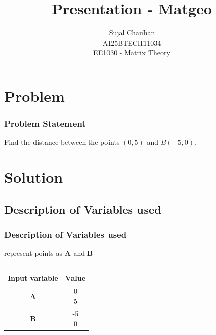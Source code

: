 \documentclass{beamer}
\title{Presentation - Matgeo}
\author{ Sujal Chauhan\\
AI25BTECH11034 \\
EE1030 - Matrix Theory}
\theoremstyle{remark}
\newcommand{\myvec}[1]{\ensuremath{\begin{pmatrix}#1\end{pmatrix}}}
\let\vec\mathbf
\numberwithin{equation}{section}
\begin{document}
\begin{frame}
\titlepage
\end{frame}

\section{Problem}
\begin{frame}
\frametitle{Problem Statement}
Find the distance between the points $(0,5)$ and $B(-5,0)$.
\end{frame}

\section{Solution}
\subsection{Description of Variables used}

\begin{frame}
\frametitle{Description of Variables used}
represent points as $\vec{A} $ and $\vec{B}$
\begin{table}[H]
\centering
\begin{tabular}[12pt]{ |c| c|}
    \hline
    \textbf{Input variable} & \textbf{Value}\\ 
    \hline
    $\vec{A}$ & \myvec{0 \\5 } \\
    \hline 
    $\vec{B}$ & \myvec{-5 \\ 0}\\
    \hline
    \end{tabular}
    \caption{
    \label{}
    }
 \end{table}


\end{frame}
\end{document}
